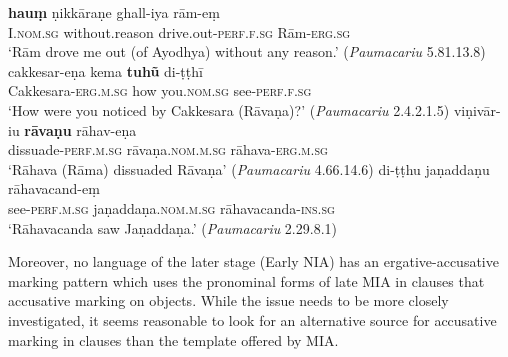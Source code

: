 \documentclass[output=paper,
modfonts
]{LSP/langsci}
\begin{document}
\begin{exe}
\ex\label{ex:yza}
\begin{xlist}
\ex\label{ex:haum}\gll \textbf{hauṃ} ṇikkāraṇe ghall-iya  rām-eṃ \\
I.\textsc{nom.sg} without.reason drive.out-\textsc{perf.f.sg} Rām-\textsc{erg.sg} \\
\glt `Rām drove me out (of Ayodhya) without any reason.' (\textit{Paumacariu} 5.81.13.8) 
\ex\label{ex:cakkesarena}\gll cakkesar-eṇa kema \textbf{tuhũ} di-ṭṭhī \\ Cakkesara-\textsc{erg.m.sg} how you.\textsc{nom.sg} see-\textsc{perf.f.sg} \\
\glt `How were you noticed by Cakkesara (Rāvaṇa)?' (\textit{Paumacariu} 2.4.2.1.5) 
\ex\label{ex:vinivariu}\gll viṇivār-iu \textbf{rāvaṇu} rāhav-eṇa \\ dissuade-\textsc{perf.m.sg} rāvaṇa.\textsc{nom.m.sg}  rāhava-\textsc{erg.m.sg} \\
\glt `Rāhava (Rāma)  dissuaded Rāvaṇa' (\textit{Paumacariu} 4.66.14.6)
\ex\label{ex:ditthu}\gll di-ṭṭhu jaṇaddaṇu rāhavacand-eṃ \\
see-\textsc{perf.m.sg} jaṇaddaṇa.\textsc{nom.m.sg} rāhavacanda-\textsc{ins.sg} \\
\glt `Rāhavacanda saw Jaṇaddaṇa.' (\textit{Paumacariu} 2.29.8.1)
\end{xlist}
\end{exe}

Moreover, no language of the later stage (Early NIA)  has an ergative-accusative marking pattern which uses the pronominal forms of late MIA in  clauses that accusative marking on objects. While the issue needs to be more closely investigated, it seems reasonable to look for an alternative source for accusative marking in  clauses than the template offered by MIA. 
\end{document}
